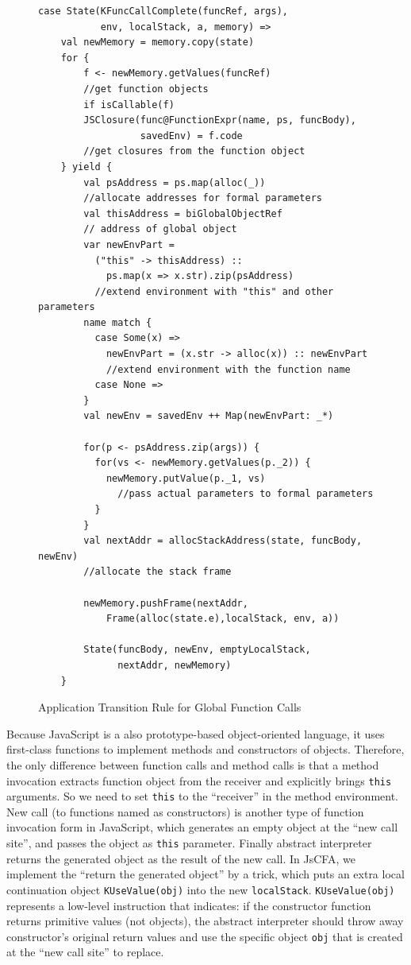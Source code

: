 \documentclass[12pt]{report}
\begin{document}
\begin{figure}
  \lstset{language=Scala}
  \begin{lstlisting}
case State(KFuncCallComplete(funcRef, args),
           env, localStack, a, memory) =>
    val newMemory = memory.copy(state)
    for {
        f <- newMemory.getValues(funcRef)
        //get function objects
        if isCallable(f)
        JSClosure(func@FunctionExpr(name, ps, funcBody),
                  savedEnv) = f.code
        //get closures from the function object
    } yield {
        val psAddress = ps.map(alloc(_))
        //allocate addresses for formal parameters
        val thisAddress = biGlobalObjectRef
        // address of global object
        var newEnvPart =
          ("this" -> thisAddress) ::
            ps.map(x => x.str).zip(psAddress)
          //extend environment with "this" and other parameters
        name match {
          case Some(x) =>
            newEnvPart = (x.str -> alloc(x)) :: newEnvPart
            //extend environment with the function name
          case None =>
        }
        val newEnv = savedEnv ++ Map(newEnvPart: _*)

        for(p <- psAddress.zip(args)) {
          for(vs <- newMemory.getValues(p._2)) {
            newMemory.putValue(p._1, vs)
              //pass actual parameters to formal parameters
          }
        }
        val nextAddr = allocStackAddress(state, funcBody, newEnv)
        //allocate the stack frame

        newMemory.pushFrame(nextAddr,
            Frame(alloc(state.e),localStack, env, a))

        State(funcBody, newEnv, emptyLocalStack,
              nextAddr, newMemory)
    }

  \end{lstlisting}
  \caption{Application Transition Rule for Global Function Calls}
\label{fig:app-call}
\end{figure}

Because JavaScript is a also prototype-based object-oriented language, it uses first-class functions to implement methods and constructors of objects.
Therefore, the only difference between function calls and method calls is that a method invocation extracts function object from the receiver and explicitly brings \verb|this| arguments. So we need to set \verb|this| to the ``receiver'' in the method environment.
New call (to functions named as constructors) is another type of function invocation form in JavaScript, which generates an empty object at the ``new call site'', and passes the object as \verb|this| parameter. Finally abstract interpreter returns the generated object as the result of the new call.
In JsCFA, we implement the ``return the generated object'' by a trick, which puts an extra local continuation object \verb|KUseValue(obj)| into the new \verb|localStack|.
\verb|KUseValue(obj)| represents a low-level instruction that indicates: if the constructor function returns primitive values (not objects), the abstract interpreter should throw away constructor's original return values and use the specific object \verb|obj| that is created at the ``new call site'' to replace.
\end{document}
